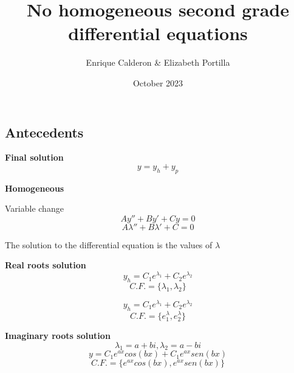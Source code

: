 \documentclass[letterpaper]{article}
\title{No homogeneous second grade differential equations}
\author{Enrique Calderon \& Elizabeth Portilla}
\date{October 2023}
\newcommand{\divline}{\noindent\makebox[\linewidth]{\rule{\textwidth}{0.4pt}}}
\begin{document}
    \maketitle

    \divline

    \begin{multicols}{2}
        \section{Antecedents}

        \textbf{Final solution}
        \[y = y_{h} + y_{p}\]

        \textbf{Homogeneous}

        Variable change
        \[Ay'' + By' +Cy = 0\]
        \[A\lambda'' + B\lambda' + C = 0\]

        The solution to the differential equation is the values of \(\lambda\)

        \textbf{Real roots solution}
        \[y_{h} = C_{1} e^{\lambda_{1}} + C_{2} e^{\lambda_{2}}\]
        \[C.F. = \{ \lambda_{1}, \lambda_{2} \}\]

        \[y_{h} = C_{1} e^{\lambda_{1}} + C_{2} e^{\lambda_{2}}\]
        \[C.F. = \{e^ \lambda_{1}, e^ \lambda_{2} \}\]
        
        \textbf{Imaginary roots solution}
        \[\lambda_{1} = a + bi , \lambda_{2} = a - bi\]
        \[y = C_{1} e^{ax}cos(bx) + C_{1} e^{ax}sen(bx)\]
        \[C.F. = \{e^{ax}cos(bx), e^{ax}sen(bx)\}\]
        
    \end{multicols}

    \divline
\end{document}
